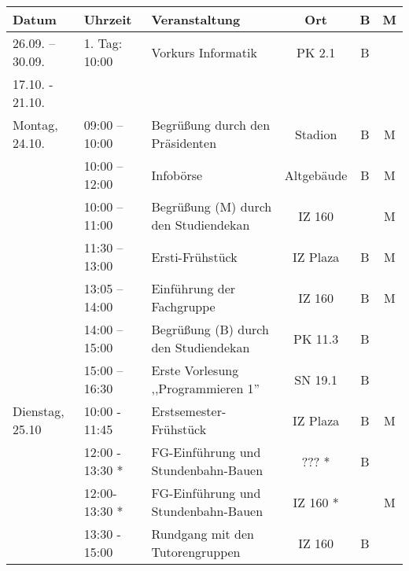\begin{tabular}{|l|l|p{6.7cm}|c|c|c|}
\hline \textbf{Datum} & \textbf{Uhrzeit} & \textbf{Veranstaltung}	& \textbf{Ort} & \textbf{B} & \textbf{M} \\
\hline 26.09. – 30.09.	& 1. Tag: 10:00	 & Vorkurs Informatik
& PK 2.1		&B& \\
17.10. - 21.10.  & & & & &    \\
\hline Montag,  24.10. 	&  09:00 – 10:00	 & Begrüßung	durch den Präsidenten									& Stadion		&B&M\\ %
\hline 			& 10:00 – 12:00	 & Infobörse										& Altgebäude	&B&M\\
\hline   	& 10:00 – 11:00	 & Begrüßung (M) \newline durch den Studiendekan	& IZ 160	& &M\\
\hline 	& 11:30 – 13:00	 & Ersti-Frühstück									& IZ Plaza		&B&M\\
\hline 			& 13:05 – 14:00	 & Einführung  der Fachgruppe					& IZ 160		&B&M\\
\hline 			& 14:00 – 15:00	 & Begrüßung (B) \newline
durch den Studiendekan	& PK 11.3	&B& \\
\hline 			& 15:00 – 16:30	 & Erste Vorlesung
,,Programmieren 1''				& SN 19.1		&B &\\
%
%
\hline Dienstag, 25.10		& 10:00 - 11:45 &
Erstsemester-Frühstück & IZ Plaza & B &M \\ 
\hline & 12:00 - 13:30 * & FG-Einführung und  \newline
Stundenbahn-Bauen & ??? * & B &\\%
\hline & 12:00-13:30 * & FG-Einführung und   \newline Stundenbahn-Bauen & IZ 160 * & & M\\
\hline &13:30 - 15:00 & Rundgang mit den  Tutorengruppen & IZ 160 & B

\end{tabular}
